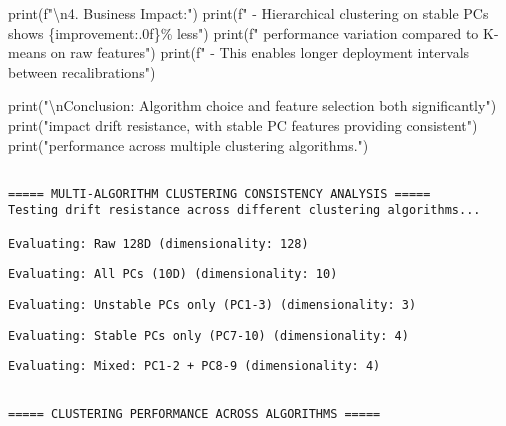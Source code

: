 \documentclass[
  letterpaper,
  DIV=11,
  numbers=noendperiod]{scrartcl}
\newenvironment{Shaded}{\begin{snugshade}}{\end{snugshade}}
\newcommand{\BuiltInTok}[1]{\textcolor[rgb]{0.00,0.23,0.31}{#1}}
\newcommand{\CharTok}[1]{\textcolor[rgb]{0.13,0.47,0.30}{#1}}
\newcommand{\NormalTok}[1]{\textcolor[rgb]{0.00,0.23,0.31}{#1}}
\newcommand{\SpecialCharTok}[1]{\textcolor[rgb]{0.37,0.37,0.37}{#1}}
\newcommand{\SpecialStringTok}[1]{\textcolor[rgb]{0.13,0.47,0.30}{#1}}
\newcommand{\StringTok}[1]{\textcolor[rgb]{0.13,0.47,0.30}{#1}}
\renewenvironment{Shaded}{%
  \begin{tcolorbox}[%
    enhanced,%
    colback=codebg,%
    colframe=codebg,%
    borderline west={3pt}{0pt}{sectionblue},%
    fontupper=\small\ttfamily,%
    boxrule=0pt,%
    arc=0pt,%
    boxsep=5pt,%
    left=2mm,%
    right=2mm,%
    top=2mm,%
    bottom=2mm%
  ]%
}{%
  \end{tcolorbox}%
}
\begin{document}
\begin{Shaded}
\begin{Highlighting}[]
        \BuiltInTok{print}\NormalTok{(}\SpecialStringTok{f"}\CharTok{\textbackslash{}n}\SpecialStringTok{4. Business Impact:"}\NormalTok{)}
        \BuiltInTok{print}\NormalTok{(}\SpecialStringTok{f"   {-} Hierarchical clustering on stable PCs shows }\SpecialCharTok{\{}\NormalTok{improvement}\SpecialCharTok{:.0f\}}\SpecialStringTok{\% less"}\NormalTok{)}
        \BuiltInTok{print}\NormalTok{(}\SpecialStringTok{f"     performance variation compared to K{-}means on raw features"}\NormalTok{)}
        \BuiltInTok{print}\NormalTok{(}\SpecialStringTok{f"   {-} This enables longer deployment intervals between recalibrations"}\NormalTok{)}

\BuiltInTok{print}\NormalTok{(}\StringTok{"}\CharTok{\textbackslash{}n}\StringTok{Conclusion: Algorithm choice and feature selection both significantly"}\NormalTok{)}
\BuiltInTok{print}\NormalTok{(}\StringTok{"impact drift resistance, with stable PC features providing consistent"}\NormalTok{)}
\BuiltInTok{print}\NormalTok{(}\StringTok{"performance across multiple clustering algorithms."}\NormalTok{)}
\end{Highlighting}
\end{Shaded}

\begin{verbatim}

===== MULTI-ALGORITHM CLUSTERING CONSISTENCY ANALYSIS =====
Testing drift resistance across different clustering algorithms...

Evaluating: Raw 128D (dimensionality: 128)
\end{verbatim}

\begin{verbatim}
Evaluating: All PCs (10D) (dimensionality: 10)
\end{verbatim}

\begin{verbatim}
Evaluating: Unstable PCs only (PC1-3) (dimensionality: 3)
\end{verbatim}

\begin{verbatim}
Evaluating: Stable PCs only (PC7-10) (dimensionality: 4)
\end{verbatim}

\begin{verbatim}
Evaluating: Mixed: PC1-2 + PC8-9 (dimensionality: 4)
\end{verbatim}

\begin{verbatim}

===== CLUSTERING PERFORMANCE ACROSS ALGORITHMS =====
\end{verbatim}
\end{document}
